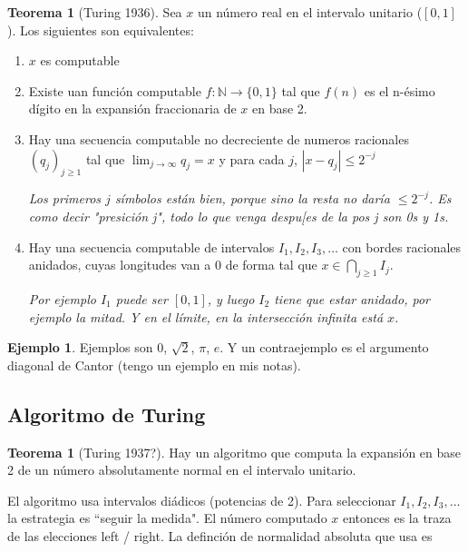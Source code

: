 \documentclass{report}
\theoremstyle{definition} %
\newtheorem{theorem}{Teorema}[chapter]
\newtheorem*{theorem*}{Teorema}
\newtheorem*{exmp*}{Ejemplo}
\begin{document}
\begin{theorem}[Turing 1936]
    Sea $x$ un número real en el intervalo unitario ($[0, 1]$). Los siguientes
    son equivalentes:

    \begin{enumerate}
        \item $x$ es computable
        \item Existe uan función computable $f: \mathbb{N} \to \{0, 1\}$ tal que
        $f(n)$ es el n-ésimo dígito en la expansión fraccionaria de $x$ en base
        2.
        \item Hay una secuencia computable no decreciente de numeros racionales
        $(q_j)_{j \geq 1}$ tal que $\lim_{j \to \infty} q_j = x$ y para cada
        $j$, $|x - q_j| \leq 2^{-j}$

        \textit{Los primeros $j$ símbolos están bien, porque sino la resta no
        daría $\leq 2^{-j}$. Es como decir "presición j", todo lo que venga
        despu[es de la pos j son 0s y 1s.}

        \item Hay una secuencia computable de intervalos $I_1, I_2, I_3, \dots$
        con bordes racionales anidados, cuyas longitudes van a 0 de forma tal
        que $x \in \bigcap_{j\geq 1} I_j$.

        \textit{Por ejemplo $I_1$ puede ser $[0, 1]$, y luego $I_2$ tiene que estar anidado, por ejemplo la mitad. Y en el límite, en la intersección infinita está $x$.}
    \end{enumerate}
\end{theorem}

\begin{exmp*}
    Ejemplos son 0, $\sqrt{2}$, $\pi$, $e$. Y un contraejemplo es el
    argumento diagonal de Cantor (tengo un ejemplo en mis notas).
\end{exmp*}

\subsection{Algoritmo de Turing}

\begin{theorem*}[Turing 1937?]
    Hay un algoritmo que computa la expansión en base 2 de un número
    absolutamente normal en el intervalo unitario.
\end{theorem*}

El algoritmo usa intervalos diádicos (potencias de 2). Para seleccionar $I_1,
I_2, I_3, \dots$ la estrategia es ``seguir la medida". El número computado $x$
entonces es la traza de las elecciones left / right. La definción de normalidad
absoluta que usa es
\end{document}
